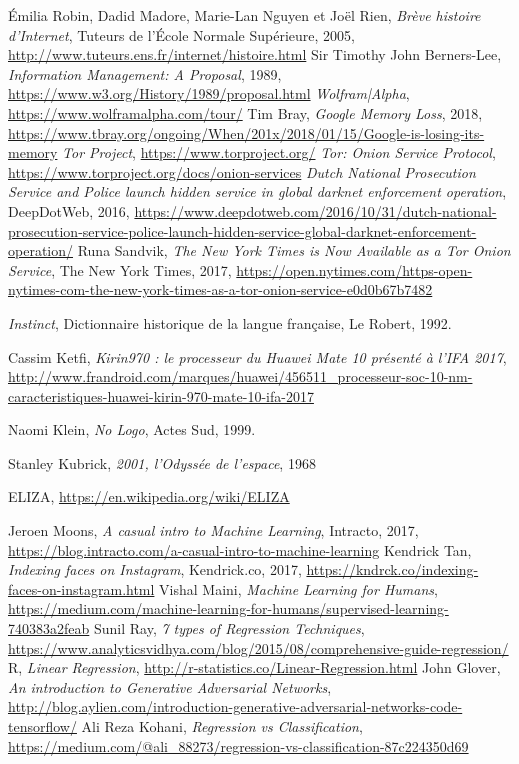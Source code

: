 \begin{thebibliography}{99}
     Émilia Robin, Dadid Madore, Marie-Lan Nguyen et Joël Rien, \emph{Brève histoire d'Internet}, Tuteurs de l'École Normale Supérieure, 2005, \url{http://www.tuteurs.ens.fr/internet/histoire.html}
     Sir Timothy John Berners-Lee, \emph{Information Management: A Proposal}, 1989, \url{https://www.w3.org/History/1989/proposal.html}
     \emph{Wolfram|Alpha}, \url{https://www.wolframalpha.com/tour/}
     Tim Bray, \emph{Google Memory Loss}, 2018, \url{https://www.tbray.org/ongoing/When/201x/2018/01/15/Google-is-losing-its-memory}
     \emph{Tor Project}, \url{https://www.torproject.org/}
     \emph{Tor: Onion Service Protocol}, \url{https://www.torproject.org/docs/onion-services}
     \emph{Dutch National Prosecution Service and Police launch hidden service in global darknet enforcement operation}, DeepDotWeb, 2016, \url{https://www.deepdotweb.com/2016/10/31/dutch-national-prosecution-service-police-launch-hidden-service-global-darknet-enforcement-operation/}
     Runa Sandvik, \emph{The New York Times is Now Available as a Tor Onion Service}, The New York Times, 2017, \url{https://open.nytimes.com/https-open-nytimes-com-the-new-york-times-as-a-tor-onion-service-e0d0b67b7482}
    
     \emph{Instinct}, Dictionnaire historique de la langue française, Le Robert, 1992. 

     Cassim Ketfi, \emph{Kirin970 : le processeur du Huawei Mate 10 présenté à l'IFA 2017}, \url{http://www.frandroid.com/marques/huawei/456511_processeur-soc-10-nm-caracteristiques-huawei-kirin-970-mate-10-ifa-2017}

     Naomi Klein, \emph{No Logo}, Actes Sud, 1999.

     Stanley Kubrick, \emph{2001, l'Odyssée de l'espace}, 1968

     ELIZA, \url{https://en.wikipedia.org/wiki/ELIZA}

     Jeroen Moons, \emph{A casual intro to Machine Learning}, Intracto, 2017, \url{https://blog.intracto.com/a-casual-intro-to-machine-learning}
     Kendrick Tan, \emph{Indexing faces on Instagram}, Kendrick.co, 2017, \url{https://kndrck.co/indexing-faces-on-instagram.html}
     Vishal Maini, \emph{Machine Learning for Humans}, \url{https://medium.com/machine-learning-for-humans/supervised-learning-740383a2feab}
     Sunil Ray, \emph{7 types of Regression Techniques}, \url{https://www.analyticsvidhya.com/blog/2015/08/comprehensive-guide-regression/}
     R, \emph{Linear Regression}, \url{http://r-statistics.co/Linear-Regression.html}
     John Glover, \emph{An introduction to Generative Adversarial Networks}, \url{http://blog.aylien.com/introduction-generative-adversarial-networks-code-tensorflow/}
     Ali Reza Kohani, \emph{Regression vs Classification}, \url{https://medium.com/@ali_88273/regression-vs-classification-87c224350d69}


\end{thebibliography}

